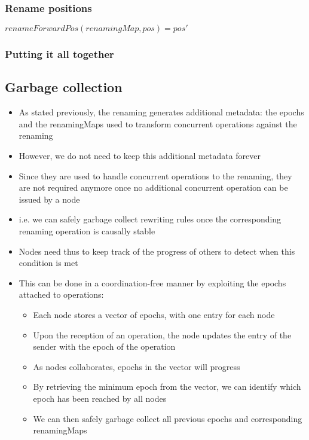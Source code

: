 \documentclass{article}
\begin{document}
\subsubsection{Rename positions}
\label{sec:renameForwardPos}


$renameForwardPos(renamingMap, pos) = pos'$

\subsubsection{Putting it all together}

\subsection{Garbage collection}

\begin{itemize}
    \item As stated previously, the renaming generates additional metadata: the epochs and the renamingMaps used to transform concurrent operations against the renaming
    \item However, we do not need to keep this additional metadata forever
    \item Since they are used to handle concurrent operations to the renaming, they are not required anymore once no additional concurrent operation can be issued by a node
    \item i.e. we can safely garbage collect rewriting rules once the corresponding renaming operation is causally stable \cite{10.1007/978-3-662-43352-2_11}
    \item Nodes need thus to keep track of the progress of others to detect when this condition is met
    \item This can be done in a coordination-free manner by exploiting the epochs attached to operations:
    \begin{itemize}
        \item Each node stores a vector of epochs, with one entry for each node
        \item Upon the reception of an operation, the node updates the entry of the sender with the epoch of the operation
        \item As nodes collaborates, epochs in the vector will progress
        \item By retrieving the minimum epoch from the vector, we can identify which epoch has been reached by all nodes
        \item We can then safely garbage collect all previous epochs and corresponding renamingMaps
    \end{itemize}
\end{itemize}
\end{document}
